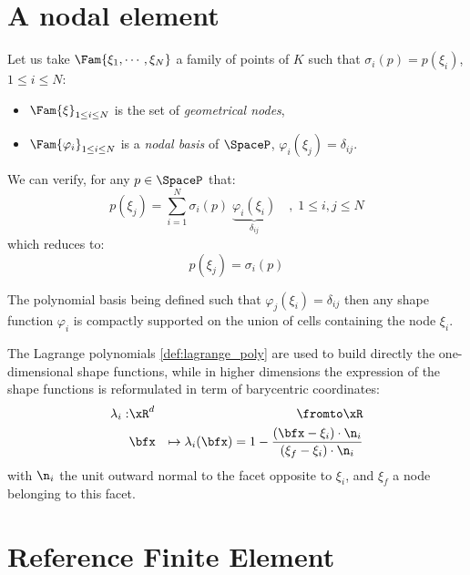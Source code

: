 \section{A nodal element}

Let us take $\Fam{\xi_1, \cdots, \xi_N}$ a family of points of $K$ such that $\sigma_i(p)= p(\xi_i)$, $1\leq i \leq N$:
\begin{itemize}
\item $\Fam{\xi}_{1\leq i \leq N}$ is the set of \textit{geometrical nodes},
\item $\Fam{\varphi_i}_{1\leq i \leq N}$ is a \textit{nodal basis} of $\SpaceP$, \ie $\varphi_i(\xi_j) = \delta_{ij}$.
\end{itemize}
We can verify, for any $p \in\SpaceP$ that:
\begin{equation*}
p(\xi_j) = \sum_{i=1}^{N} \sigma_i(p)\; \underbrace{\varphi_i(\xi_i)}_{\delta_{ij}}\quad,\; 1 \leq i,j \leq N
\end{equation*}
which reduces to:
\begin{equation*}
p(\xi_j) = \sigma_i(p)
\end{equation*}

\medskip
\begin{rmrk}
The polynomial basis being defined such that $\varphi_j(\xi_i) = \delta_{ij}$ then any shape function $\varphi_i$ is compactly supported on the union of cells containing the node $\xi_i$.
\end{rmrk}

The Lagrange polynomials \eqref{def:lagrange_poly} are used to build directly the one-dimensional shape functions, while in higher dimensions the expression of the shape functions is reformulated in term of barycentric coordinates:
\begin{eqnarray*}
\lambda_i:& \xR^d &\fromto \xR\\
          & \bfx  &\mapsto \lambda_i(\bfx) = 1 - \dfrac{(\bfx - \mathbf\xi_i)\cdot\n_i}{(\mathbf\xi_{f} - \mathbf\xi_i)\cdot\n_i}
\end{eqnarray*}
with $\n_i$ the unit outward normal to the facet opposite to $\xi_i$, and $\xi_f$ a node belonging to this facet.

\section{Reference Finite Element}

